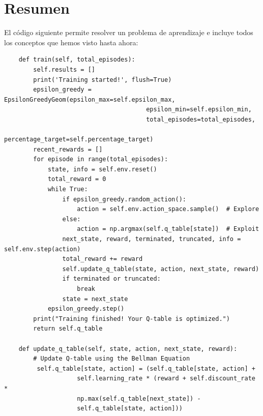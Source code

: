 \documentclass{article}
\begin{document}


\section{Resumen}
El código siguiente permite resolver un problema de aprendizaje e incluye todos los conceptos que hemos visto hasta ahora:
\begin{verbatim}
    def train(self, total_episodes):
        self.results = []
        print('Training started!', flush=True)
        epsilon_greedy = EpsilonGreedyGeom(epsilon_max=self.epsilon_max,
                                       epsilon_min=self.epsilon_min,
                                       total_episodes=total_episodes,
                                       percentage_target=self.percentage_target)
        recent_rewards = []
        for episode in range(total_episodes):
            state, info = self.env.reset()
            total_reward = 0
            while True:
                if epsilon_greedy.random_action():
                    action = self.env.action_space.sample()  # Explore
                else:
                    action = np.argmax(self.q_table[state])  # Exploit
                next_state, reward, terminated, truncated, info = self.env.step(action)
                total_reward += reward
                self.update_q_table(state, action, next_state, reward)
                if terminated or truncated:
                    break
                state = next_state
            epsilon_greedy.step()
        print("Training finished! Your Q-table is optimized.")
        return self.q_table

    def update_q_table(self, state, action, next_state, reward):
        # Update Q-table using the Bellman Equation
         self.q_table[state, action] = (self.q_table[state, action] +
                    self.learning_rate * (reward + self.discount_rate * 
                    np.max(self.q_table[next_state]) -
                    self.q_table[state, action]))


\end{verbatim}
\end{document}

